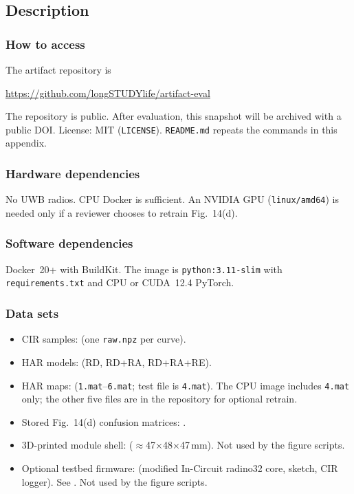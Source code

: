 \documentclass[10pt,twocolumn]{article}
\begin{document}
\subsection{Description}

\subsubsection{How to access}

The artifact repository is

\begin{center}
\url{https://github.com/longSTUDYlife/artifact-eval}
\end{center}

The repository is public. After evaluation, this snapshot will
be archived with a public DOI.
License: MIT (\texttt{LICENSE}). \texttt{README.md} repeats the
commands in this appendix.

\subsubsection{Hardware dependencies}

No UWB radios. CPU Docker is sufficient. An NVIDIA GPU
(\texttt{linux/amd64}) is needed only if a reviewer chooses to retrain
Fig.~14(d).

\subsubsection{Software dependencies}

Docker~20+ with BuildKit. The image is \texttt{python:3.11-slim} with
\texttt{requirements.txt} and CPU or CUDA~12.4 PyTorch.

\subsubsection{Data sets}

\begin{itemize}
  \item CIR samples:  (one \texttt{raw.npz} per curve).
  \item HAR models: 
        (RD, RD+RA, RD+RA+RE).
  \item HAR maps: 
        (\texttt{1.mat}--\texttt{6.mat}; test file is \texttt{4.mat}).
        The CPU image includes \texttt{4.mat} only; the other five
        files are in the repository for optional retrain.
  \item Stored Fig.~14(d) confusion matrices: .
  \item 3D-printed module shell: 
        ($\approx$47$\times$48$\times$47\,mm). Not used by the figure
        scripts.
  \item Optional testbed firmware: 
        (modified In-Circuit radino32 core, sketch, CIR logger).
        See . Not used by the figure scripts.
\end{itemize}
\end{document}
